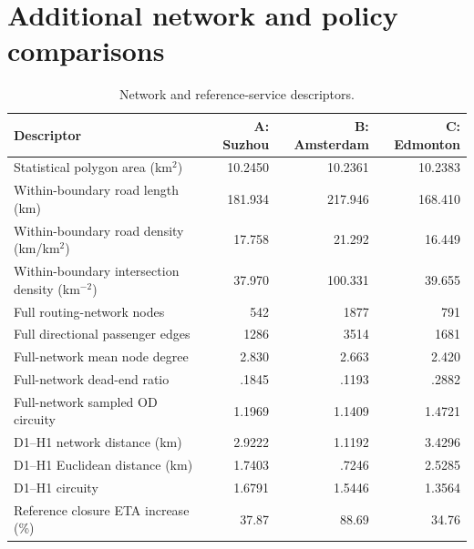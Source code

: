 \documentclass[11pt,a4paper]{article}
\begin{document}
\clearpage
\section{Additional network and policy comparisons}

\begin{table}[H]
\centering
\small
\setlength{\tabcolsep}{3pt}
\caption{Network and reference-service descriptors.}
\label{tab:extended_table3}
\begin{tabularx}{\textwidth}{@{}Yrrr@{}}
\toprule
Descriptor & A: Suzhou & B: Amsterdam & C: Edmonton \\
\midrule
Statistical polygon area (km$^2$) & 10.2450 & 10.2361 & 10.2383 \\
Within-boundary road length (km) & 181.934 & 217.946 & 168.410 \\
Within-boundary road density (km/km$^2$) & 17.758 & 21.292 & 16.449 \\
Within-boundary intersection density (km$^{-2}$) & 37.970 & 100.331 & 39.655 \\
Full routing-network nodes & 542 & 1877 & 791 \\
Full directional passenger edges & 1286 & 3514 & 1681 \\
Full-network mean node degree & 2.830 & 2.663 & 2.420 \\
Full-network dead-end ratio & .1845 & .1193 & .2882 \\
Full-network sampled OD circuity & 1.1969 & 1.1409 & 1.4721 \\
D1--H1 network distance (km) & 2.9222 & 1.1192 & 3.4296 \\
D1--H1 Euclidean distance (km) & 1.7403 & .7246 & 2.5285 \\
D1--H1 circuity & 1.6791 & 1.5446 & 1.3564 \\
Reference closure ETA increase (\%) & 37.87 & 88.69 & 34.76 \\
\bottomrule
\end{tabularx}
\end{table}
\end{document}
